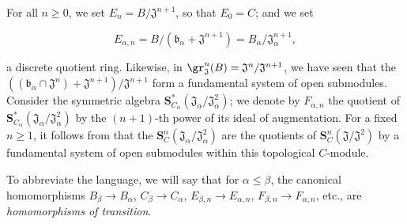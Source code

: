 \begin{env}[19.5.6.2]
\label{0.19.5.6.2}
For all $n\geq 0$, we set $E_n=B/\mathfrak{J}^{n+1}$, so that $E_0=C$;
and we set

\[
E_{\alpha,n}=B/(\mathfrak{b}_\alpha+\mathfrak{J}^{n+1})=B_\alpha/\mathfrak{J}_\alpha^{n+1},
\]

a discrete quotient ring.
Likewise, in $\gr_\mathfrak{J}^n(B)=\mathfrak{J}^n/\mathfrak{J}^{n+1}$, we have seen that the $((\mathfrak{b}_\alpha\cap\mathfrak{J}^n)+\mathfrak{J}^{n+1})/\mathfrak{J}^{n+1}$ form a fundamental system of open submodules.
Consider the symmetric algebra $\mathbf{S}_{C_\alpha}^*(\mathfrak{J}_\alpha/\mathfrak{J}_\alpha^2)$;
we denote by $F_{\alpha,n}$ the quotient of $\mathbf{S}_{C_\alpha}^*(\mathfrak{J}_\alpha/\mathfrak{J}_\alpha^2)$ by the $(n+1)$-th power of its ideal of augmentation.
For a fixed $n\geq 1$, it follows from  that the $\mathbf{S}_C^n(\mathfrak{J}_\alpha/\mathfrak{J}_\alpha^2)$ are the quotients of $\mathbf{S}_C^n(\mathfrak{J}/\mathfrak{J}^2)$ by a fundamental system of open submodules within this topological $C$-module.

To abbreviate the language, we will say that for $\alpha\leq\beta$, the canonical homomorphisms $B_\beta\to B_\alpha$, $C_\beta\to C_\alpha$, $E_{\beta,n}\to E_{\alpha,n}$, $F_{\beta,n}\to F_{\alpha,n}$, etc., are \emph{homomorphisms of transition}.
\end{env}

